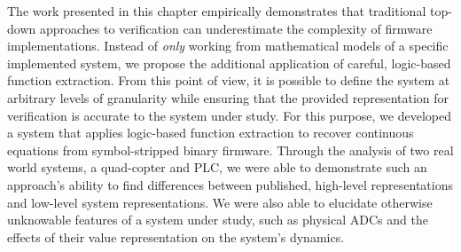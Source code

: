 The work presented in this chapter empirically demonstrates that traditional top-down approaches to verification can underestimate the complexity of firmware implementations.
Instead of \emph{only} working from mathematical models of a specific implemented system, we propose the additional application of careful, logic-based function extraction.
From this point of view, it is possible to define the system at arbitrary levels of granularity while ensuring that the provided representation for verification is accurate to the system under study.
For this purpose, we developed a system that applies logic-based function extraction to recover continuous equations from symbol-stripped binary firmware.
Through the analysis of two real world systems, a quad-copter and PLC, we were able to demonstrate such an approach's ability to find differences between published, high-level representations and low-level system representations.
We were also able to elucidate otherwise unknowable features of a system under study, such as physical ADCs and the effects of their value representation on the system's dynamics.
